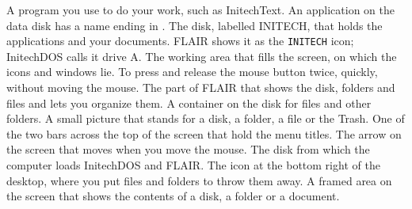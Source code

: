 A program you use to do your work, such as
InitechText.  An application on the data disk has a name ending in
.
The disk, labelled INITECH, that holds the
applications and your documents.  FLAIR shows it as the \texttt{INITECH}
icon; InitechDOS calls it drive A.
The working area that fills the screen, on which the
icons and windows lie.
To press and release the mouse button twice,
quickly, without moving the mouse.
The part of FLAIR that shows the disk, folders and
files and lets you organize them.
A container on the disk for files and other folders.
A small picture that stands for a disk, a folder, a file
or the Trash.
One of the two bars across the top of the screen
that hold the menu titles.
The arrow on the screen that moves when you move the
mouse.
The disk from which the computer loads
InitechDOS and FLAIR.
The icon at the bottom right of the desktop, where you
put files and folders to throw them away.
A framed area on the screen that shows the contents of
a disk, a folder or a document.

